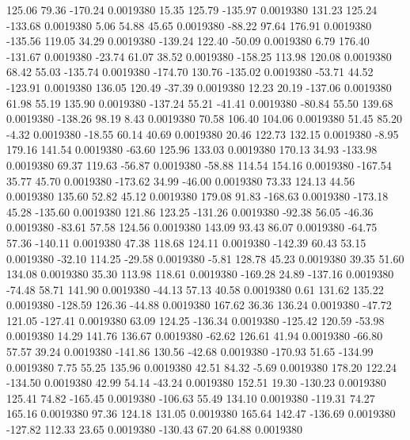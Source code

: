   125.06   79.36 -170.24   0.0019380
   15.35  125.79 -135.97   0.0019380
  131.23  125.24 -133.68   0.0019380
    5.06   54.88   45.65   0.0019380
  -88.22   97.64  176.91   0.0019380
 -135.56  119.05   34.29   0.0019380
 -139.24  122.40  -50.09   0.0019380
    6.79  176.40 -131.67   0.0019380
  -23.74   61.07   38.52   0.0019380
 -158.25  113.98  120.08   0.0019380
   68.42   55.03 -135.74   0.0019380
 -174.70  130.76 -135.02   0.0019380
  -53.71   44.52 -123.91   0.0019380
  136.05  120.49  -37.39   0.0019380
   12.23   20.19 -137.06   0.0019380
   61.98   55.19  135.90   0.0019380
 -137.24   55.21  -41.41   0.0019380
  -80.84   55.50  139.68   0.0019380
 -138.26   98.19    8.43   0.0019380
   70.58  106.40  104.06   0.0019380
   51.45   85.20   -4.32   0.0019380
  -18.55   60.14   40.69   0.0019380
   20.46  122.73  132.15   0.0019380
   -8.95  179.16  141.54   0.0019380
  -63.60  125.96  133.03   0.0019380
  170.13   34.93 -133.98   0.0019380
   69.37  119.63  -56.87   0.0019380
  -58.88  114.54  154.16   0.0019380
 -167.54   35.77   45.70   0.0019380
 -173.62   34.99  -46.00   0.0019380
   73.33  124.13   44.56   0.0019380
  135.60   52.82   45.12   0.0019380
  179.08   91.83 -168.63   0.0019380
 -173.18   45.28 -135.60   0.0019380
  121.86  123.25 -131.26   0.0019380
  -92.38   56.05  -46.36   0.0019380
  -83.61   57.58  124.56   0.0019380
  143.09   93.43   86.07   0.0019380
  -64.75   57.36 -140.11   0.0019380
   47.38  118.68  124.11   0.0019380
 -142.39   60.43   53.15   0.0019380
  -32.10  114.25  -29.58   0.0019380
   -5.81  128.78   45.23   0.0019380
   39.35   51.60  134.08   0.0019380
   35.30  113.98  118.61   0.0019380
 -169.28   24.89 -137.16   0.0019380
  -74.48   58.71  141.90   0.0019380
  -44.13   57.13   40.58   0.0019380
    0.61  131.62  135.22   0.0019380
 -128.59  126.36  -44.88   0.0019380
  167.62   36.36  136.24   0.0019380
  -47.72  121.05 -127.41   0.0019380
   63.09  124.25 -136.34   0.0019380
 -125.42  120.59  -53.98   0.0019380
   14.29  141.76  136.67   0.0019380
  -62.62  126.61   41.94   0.0019380
  -66.80   57.57   39.24   0.0019380
 -141.86  130.56  -42.68   0.0019380
 -170.93   51.65 -134.99   0.0019380
    7.75   55.25  135.96   0.0019380
   42.51   84.32   -5.69   0.0019380
  178.20  122.24 -134.50   0.0019380
   42.99   54.14  -43.24   0.0019380
  152.51   19.30 -130.23   0.0019380
  125.41   74.82 -165.45   0.0019380
 -106.63   55.49  134.10   0.0019380
 -119.31   74.27  165.16   0.0019380
   97.36  124.18  131.05   0.0019380
  165.64  142.47 -136.69   0.0019380
 -127.82  112.33   23.65   0.0019380
 -130.43   67.20   64.88   0.0019380
